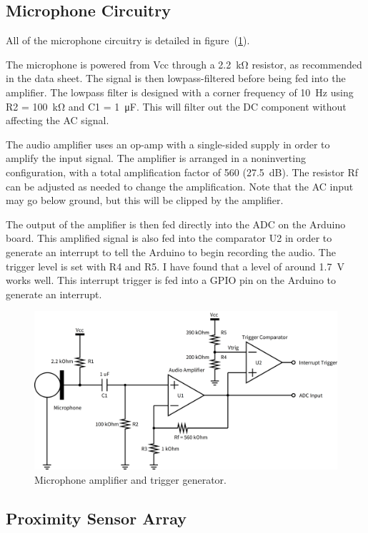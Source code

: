 \documentclass[11pt]{article}           %
\begin{document}
\subsection{Microphone Circuitry}
\label{sub:microphone_circuitry}

All of the microphone circuitry is detailed in figure~(\ref{fig:microphone}).

The microphone is powered from Vcc through a \SI{2.2}{\kilo\ohm} resistor,
as recommended in the data sheet. The signal is then lowpass-filtered before
being fed into the amplifier. The lowpass filter is designed with a corner
frequency of \SI{10}{\hertz} using R2 = \SI{100}{\kilo\ohm} and C1 =
\SI{1}{\micro\farad}. This will filter out the DC component without affecting
the AC signal.

The audio amplifier uses an op-amp with a single-sided supply in order to
amplify the input signal. The amplifier is arranged in a noninverting
configuration, with a total amplification factor of 560 (\SI{27.5}{\deci\bel}).
The resistor Rf can be adjusted as needed to change the amplification. Note
that the AC input may go below ground, but this will be clipped by the
amplifier.

The output of the amplifier is then fed directly into the ADC on the Arduino
board. This amplified signal is also fed into the comparator U2 in order to
generate an interrupt to tell the Arduino to begin recording the audio. The
trigger level is set with R4 and R5. I have found that a level of around
\SI{1.7}{\volt} works well. This interrupt trigger is fed into a GPIO pin on the
Arduino to generate an interrupt.

\begin{figure}[h]
    \centering
    \includegraphics[width=0.8\linewidth]{sch/microphone.png}
    \caption{Microphone amplifier and trigger generator.}
\label{fig:microphone}
\end{figure}

\subsection{Proximity Sensor Array}
\label{sub:proximity_sensor_array}
\end{document}
